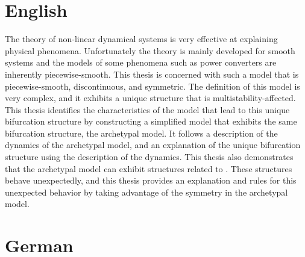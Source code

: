 \section{English}

The theory of non-linear dynamical systems is very effective at explaining physical phenomena.
Unfortunately the theory is mainly developed for smooth systems and the models of some phenomena such as power converters are inherently piecewise-smooth.
This thesis is concerned with such a model that is piecewise-smooth, discontinuous, and symmetric.
The definition of this model is very complex, and it exhibits a unique  structure that is multistability-affected.
This thesis identifies the characteristics of the model that lead to this unique bifurcation structure by constructing a simplified model that exhibits the same bifurcation structure, the archetypal model.
It follows a description of the dynamics of the archetypal model, and an explanation of the unique bifurcation structure using the description of the dynamics.
This thesis also demonstrates that the archetypal model can exhibit structures related to .
These structures behave unexpectedly, and this thesis provides an explanation and rules for this unexpected behavior by taking advantage of the symmetry in the archetypal model.


\section{German}

